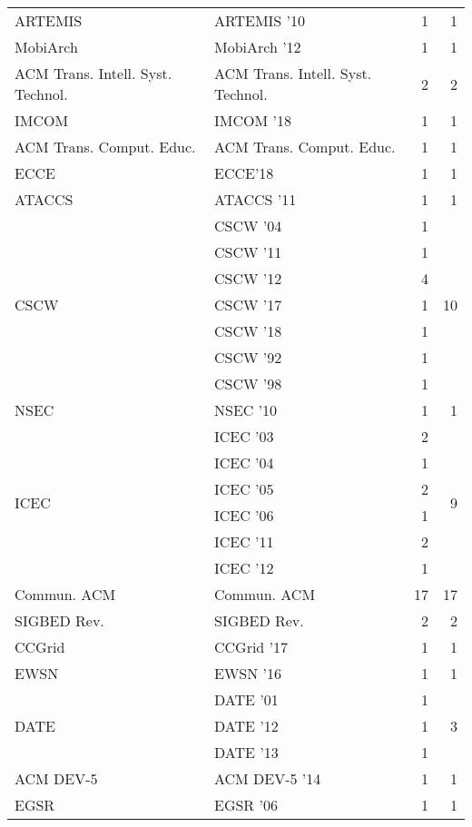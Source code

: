 \begin{table*}[t]
\begin{tabular}{llrr}
\multirow{1}{*}{ARTEMIS } & ARTEMIS '10 & 1 & \multirow{1}{*}{1}\\
\multirow{1}{*}{MobiArch } & MobiArch '12 & 1 & \multirow{1}{*}{1}\\
\multirow{1}{*}{ACM Trans. Intell. Syst. Technol.} & ACM Trans. Intell. Syst. Technol. & 2 & \multirow{1}{*}{2}\\
\multirow{1}{*}{IMCOM } & IMCOM '18 & 1 & \multirow{1}{*}{1}\\
\multirow{1}{*}{ACM Trans. Comput. Educ.} & ACM Trans. Comput. Educ. & 1 & \multirow{1}{*}{1}\\
\multirow{1}{*}{ECCE} & ECCE'18 & 1 & \multirow{1}{*}{1}\\
\multirow{1}{*}{ATACCS } & ATACCS '11 & 1 & \multirow{1}{*}{1}\\
\multirow{7}{*}{CSCW } & CSCW '04 & 1 & \multirow{7}{*}{10}\\
& CSCW '11 & 1 &\\
& CSCW '12 & 4 &\\
& CSCW '17 & 1 &\\
& CSCW '18 & 1 &\\
& CSCW '92 & 1 &\\
& CSCW '98 & 1 &\\
\multirow{1}{*}{NSEC } & NSEC '10 & 1 & \multirow{1}{*}{1}\\
\multirow{6}{*}{ICEC } & ICEC '03 & 2 & \multirow{6}{*}{9}\\
& ICEC '04 & 1 &\\
& ICEC '05 & 2 &\\
& ICEC '06 & 1 &\\
& ICEC '11 & 2 &\\
& ICEC '12 & 1 &\\
\multirow{1}{*}{Commun. ACM} & Commun. ACM & 17 & \multirow{1}{*}{17}\\
\multirow{1}{*}{SIGBED Rev.} & SIGBED Rev. & 2 & \multirow{1}{*}{2}\\
\multirow{1}{*}{CCGrid } & CCGrid '17 & 1 & \multirow{1}{*}{1}\\
\multirow{1}{*}{EWSN } & EWSN '16 & 1 & \multirow{1}{*}{1}\\
\multirow{3}{*}{DATE } & DATE '01 & 1 & \multirow{3}{*}{3}\\
& DATE '12 & 1 &\\
& DATE '13 & 1 &\\
\multirow{1}{*}{ACM DEV-5 } & ACM DEV-5 '14 & 1 & \multirow{1}{*}{1}\\
\multirow{1}{*}{EGSR } & EGSR '06 & 1 & \multirow{1}{*}{1}\\

\end{tabular}
\end{table*}
